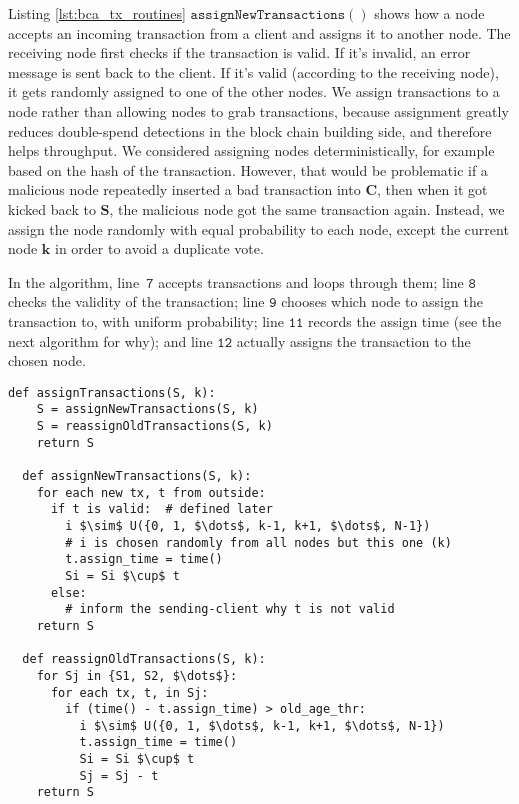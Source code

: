 Listing \ref{lst:bca_tx_routines} $\mathtt{assignNewTransactions()}$ shows how a node accepts an incoming transaction from a client and assigns it to another node.
The receiving node first checks if the transaction is valid. If it's invalid, an error message is sent back to the client. If it's valid (according to the receiving node), it gets randomly assigned to one of the other nodes.
We assign transactions to a node rather than allowing nodes to grab transactions, because assignment greatly reduces double-spend detections in the block chain building side, and therefore helps throughput.
We considered assigning nodes deterministically, for example based on the hash of the transaction.
However, that would be problematic if a malicious node repeatedly inserted a bad transaction into $\mathbf{C}$, then when it got kicked back to $\mathbf{S}$, the malicious node got the same transaction again.
Instead, we assign the node randomly with equal probability to each node, except the current node $\mathbf{k}$ in order to avoid a duplicate vote.

In the algorithm, line~$\mathtt{7}$ accepts transactions and loops through them; line $\mathtt{8}$ checks the validity of the transaction; line $\mathtt{9}$ chooses which node to assign the transaction to, with uniform probability; line $\mathtt{11}$ records the assign time (see the next algorithm for why); and line $\mathtt{12}$ actually assigns the transaction to the chosen node.

\begin{minipage}{\linewidth}
  \begin{lstlisting}[caption={Routines for accepting and assigning transactions.}, label={lst:bca_tx_routines}, style=python, mathescape=true]
  def assignTransactions(S, k):
    S = assignNewTransactions(S, k) 
    S = reassignOldTransactions(S, k) 
    return S 
    
  def assignNewTransactions(S, k): 
    for each new tx, t from outside: 
      if t is valid:  # defined later
        i $\sim$ U({0, 1, $\dots$, k-1, k+1, $\dots$, N-1})
        # i is chosen randomly from all nodes but this one (k) 
        t.assign_time = time() 
        Si = Si $\cup$ t
      else:
        # inform the sending-client why t is not valid 
    return S 
    
  def reassignOldTransactions(S, k): 
    for Sj in {S1, S2, $\dots$}: 
      for each tx, t, in Sj: 
        if (time() - t.assign_time) > old_age_thr:
          i $\sim$ U({0, 1, $\dots$, k-1, k+1, $\dots$, N-1})
          t.assign_time = time()
          Si = Si $\cup$ t
          Sj = Sj - t
    return S
  \end{lstlisting}
\end{minipage}

